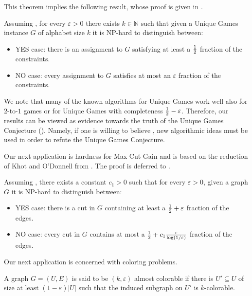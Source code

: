 \documentclass{toc}
\newcommand\card[1]{\left| {#1} \right|}
\newcommand\half{{1\over2}}
\newcommand\eps{\varepsilon}
\begin{document}
This %
theorem
implies the following result, whose proof
%
is given in
.
\begin{corollary}\label{corr:UG}
Assuming , for every $\eps>0$ there exists $k\in \mathbb{N}$ such that
given a Unique Games instance $G$ of alphabet size $k$ it is NP-hard to distinguish between:
\begin{itemize}
  \item YES case: there is an assignment to $G$ satisfying at least
  a %
  $\half$ fraction of the constraints.
  \item NO case: every assignment to $G$ satisfies at most
  an %
  $\eps$ fraction of the constraints.
\end{itemize}
\end{corollary}


We note that many of the known algorithms for Unique Games work well also for $2$-to-$1$ games or for Unique Games with
completeness $\half-\eps$. Therefore, our results can be viewed as evidence towards the truth of the Unique Games Conjecture
(). Namely, if one is willing to believe , new algorithmic ideas must be used
in order to refute the Unique Games Conjecture.


Our next application is hardness for Max-Cut-Gain and is based on the reduction of Khot and
O'Donnell
%
from \cite{KhotOdonell}.
The proof is deferred to .
\begin{corollary}\label{cor:MCG}
Assuming ,
there exists a constant $c_1>0$ such that for every $\eps>0$,
given a graph $G$ it is NP-hard
to distinguish between:
\begin{itemize}
  \item YES case: there is a cut in $G$ containing at least a $\half+\eps$ fraction of the edges.
  \item NO case: every cut in $G$ contains at most a $\half+c_1\frac{\eps}{\log(1/\eps)}$ fraction of the edges.
\end{itemize}
\end{corollary}

Our next application is concerned with coloring problems.
\begin{definition}
A graph $G=(U,E)$ is said to be $(k,\eps)$ almost colorable if there is $U'\subseteq U$ of size at least
$(1-\eps)\card{U}$ such that the induced subgraph on $U'$ is $k$-colorable.
\end{definition}
\end{document}
